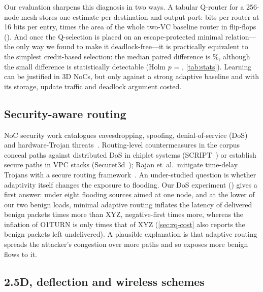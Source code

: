 Our evaluation sharpens this diagnosis in two ways. A tabular Q-router for a 256-node mesh stores one estimate per destination and output port:  bits per router at 16 bits per entry,  times the area of the whole two-VC baseline router in flip-flops (). And once the Q-selection is placed on an escape-protected minimal relation---the only way we found to make it deadlock-free---it is practically equivalent to the simplest credit-based selection: the median paired difference is \%, although the small difference is statistically detectable (Holm $p$ = , \cref{tab:stats}). Learning can be justified in 3D NoCs, but only against a strong adaptive baseline and with its storage, update traffic and deadlock argument costed.

\subsection{Security-aware routing}
\label{sec:rev-security}

NoC security work catalogues eavesdropping, spoofing, denial-of-service (DoS) and hardware-Trojan threats~\cite{charles2021security,weerasena2023security}. Routing-level countermeasures in the corpus conceal paths against distributed DoS in chiplet systems (SCRIPT~\cite{taheri2024script}) or establish secure paths in VPC stacks (Securet3d~\cite{dasilva2025securet3d}); Rajan et~al.\ mitigate time-delay Trojans with a secure routing framework~\cite{rajan2023trojan}. An under-studied question is whether adaptivity itself changes the exposure to flooding. Our DoS experiment () gives a first answer: under eight flooding sources aimed at one node, and at the lower of our two benign loads, minimal adaptive routing inflates the latency of delivered benign packets  times more than XYZ, negative-first  times more, whereas the inflation of O1TURN is only  times that of XYZ (\cref{sec:rq-cost} also reports the benign packets left undelivered). A plausible explanation is that adaptive routing spreads the attacker's congestion over more paths and so exposes more benign flows to it.

\subsection{2.5D, deflection and wireless schemes}
\label{sec:rev-25d}


